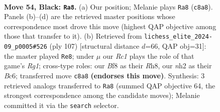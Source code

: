 \documentclass[11pt]{article}
\begin{document}
\begin{figure}[p]\centering
\begin{subfigure}{0.46\textwidth}\centering
\resizebox{\linewidth}{!}{%
\newchessgame
\chessboard[
  setfen={2rk1b2/6p1/p1p4r/Pp1b1p1p/2p2P1P/2B1P1P1/1P5N/1R1K2R1 b - - 10 54},
  showmover=false,
  pgfstyle=straightmove, color=movearrow, markmove={c8-a8}
]}
\caption{}
\end{subfigure}\hfill
\begin{subfigure}{0.46\textwidth}\centering
\resizebox{\linewidth}{!}{%
\newchessgame
\chessboard[
  setfen={6rr/5p2/1kb1p1p1/1p1pP2p/pP3P2/P1P1R1P1/4B2P/2KR4 b - - 48 54},
  showmover=false,
  pgfstyle=straightmove, color=movearrow, markmove={g8-e8}
]}
\caption{}
\end{subfigure}
\\[4pt]

\caption{\textbf{Move 54, Black: \texttt{Ra8}.} (a) Our position; Melanie plays \texttt{Ra8} (\texttt{c8a8}). Panels (b)--(d) are the retrieved master positions whose correspondence most drove this move (highest QAP objective among those that transfer to it). (b) Retrieved from \texttt{lichess\_elite\_2024-09\_p0005\#526} (ply 107) [structural distance $d$=66, QAP obj=31]: the master played \texttt{Re8}; under $\mu$ our \emph{Rc1} plays the role of that game's \emph{Rg1}; cross-type roles: our \emph{B}f8 as their \emph{R}h8, our \emph{n}h2 as their \emph{B}c6; transferred move \texttt{c8a8} \textbf{(endorses this move)}. Synthesis: 3 retrieved analogs transferred to \texttt{Ra8} (summed QAP objective 64, the strongest correspondence among the candidate moves); Melanie committed it via the \texttt{search} selector.}
\label{fig:thought-m107}
\end{figure}

\clearpage
\end{document}
